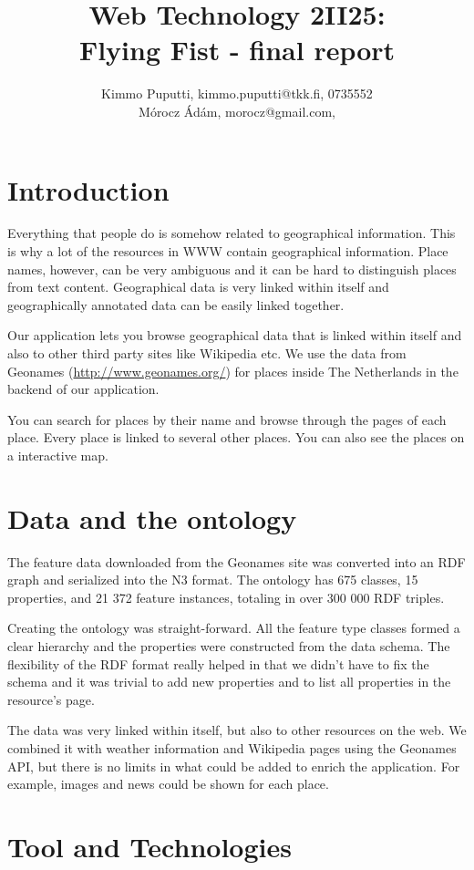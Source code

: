 \documentclass[a4paper,12pt]{article}
\title{Web Technology 2II25:\\Flying Fist - final report}
\author{Kimmo Puputti, kimmo.puputti@tkk.fi, 0735552\\M\'orocz \'Ad\'am, morocz@gmail.com, }
\begin{document}
\maketitle

\section{Introduction}

Everything that people do is somehow related to geographical
information. This is why a lot of the resources in WWW contain
geographical information. Place names, however, can be very ambiguous
and it can be hard to distinguish places from text
content. Geographical data is very linked within itself and
geographically annotated data can be easily linked together.

Our application lets you browse geographical data that is linked
within itself and also to other third party sites like Wikipedia
etc. We use the data from Geonames (\url{http://www.geonames.org/})
for places inside The Netherlands in the backend of our application.

You can search for places by their name and browse through the pages
of each place. Every place is linked to several other places. You can
also see the places on a interactive map.

\section{Data and the ontology}

The feature data downloaded from the Geonames site was converted into
an RDF graph and serialized into the N3 format. The ontology has 675
classes, 15 properties, and 21 372 feature instances, totaling in over
300 000 RDF triples.

Creating the ontology was straight-forward. All the feature type
classes formed a clear hierarchy and the properties were constructed
from the data schema. The flexibility of the RDF format really helped
in that we didn't have to fix the schema and it was trivial to add new
properties and to list all properties in the resource's page.

The data was very linked within itself, but also to other resources on
the web. We combined it with weather information and Wikipedia pages
using the Geonames API, but there is no limits in what could be added
to enrich the application. For example, images and news could be shown
for each place.

\section{Tool and Technologies}
\end{document}
